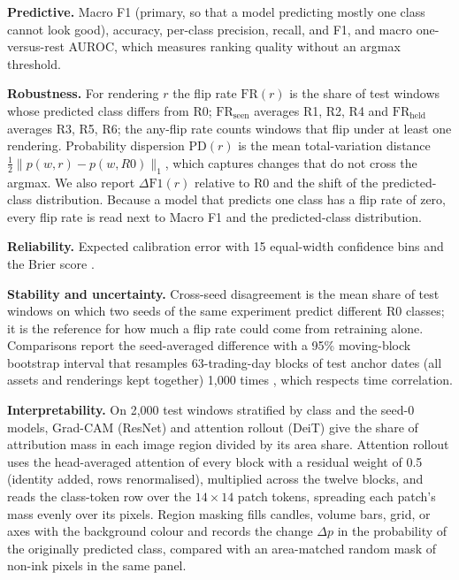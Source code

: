 \documentclass[10pt,journal,compsoc]{IEEEtran}
\begin{document}
\textbf{Predictive.} Macro F1 (primary, so that a model predicting mostly one class cannot look good), accuracy, per-class precision, recall, and F1, and macro one-versus-rest AUROC, which measures ranking quality without an argmax threshold.

\textbf{Robustness.} For rendering $r$ the flip rate $\mathrm{FR}(r)$ is the share of test windows whose predicted class differs from R0; $\mathrm{FR}_{\text{seen}}$ averages R1, R2, R4 and $\mathrm{FR}_{\text{held}}$ averages R3, R5, R6; the any-flip rate counts windows that flip under at least one rendering. Probability dispersion $\mathrm{PD}(r)$ is the mean total-variation distance $\tfrac{1}{2}\lVert p(w,r) - p(w,R0)\rVert_1$, which captures changes that do not cross the argmax. We also report $\Delta\mathrm{F1}(r)$ relative to R0 and the shift of the predicted-class distribution. Because a model that predicts one class has a flip rate of zero, every flip rate is read next to Macro F1 and the predicted-class distribution.

\textbf{Reliability.} Expected calibration error with 15 equal-width confidence bins \cite{naeini2015ece} and the Brier score \cite{brier1950verification}.

\textbf{Stability and uncertainty.} Cross-seed disagreement is the mean share of test windows on which two seeds of the same experiment predict different R0 classes; it is the reference for how much a flip rate could come from retraining alone. Comparisons report the seed-averaged difference with a 95\% moving-block bootstrap interval that resamples 63-trading-day blocks of test anchor dates (all assets and renderings kept together) 1{,}000 times \cite{kunsch1989jackknife}, which respects time correlation.

\textbf{Interpretability.} On 2{,}000 test windows stratified by class and the seed-0 models, Grad-CAM \cite{selvaraju2017gradcam} (ResNet) and attention rollout \cite{abnar2020rollout} (DeiT) give the share of attribution mass in each image region divided by its area share. Attention rollout uses the head-averaged attention of every block with a residual weight of 0.5 (identity added, rows renormalised), multiplied across the twelve blocks, and reads the class-token row over the $14 \times 14$ patch tokens, spreading each patch's mass evenly over its pixels. Region masking fills candles, volume bars, grid, or axes with the background colour and records the change $\Delta p$ in the probability of the originally predicted class, compared with an area-matched random mask of non-ink pixels in the same panel.
\end{document}
